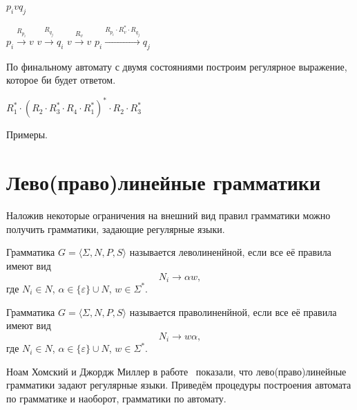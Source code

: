 $p_i v q_j$

$p_i \xrightarrow{R_{p_i}} v$
$v \xrightarrow{R_{q_j}} q_i$
$v \xrightarrow{R_v} v$
$p_i \xrightarrow{R_{p_i} \cdot R_v^* \cdot R_{q_j}} q_j$

По финальному автомату с двумя состояниями построим регулярное выражение, которое би будет ответом.


$R_1^* \cdot (R_2 \cdot R_3^* \cdot R_4 \cdot R_1^*)^* \cdot R_2 \cdot R_3^*$



Примеры.



\section{Лево(право)линейные грамматики}

Наложив некоторые ограничения на внешний вид правил грамматики можно получить грамматики, задающие регулярные языки.

\begin{definition}
    Грамматика $G=\langle \Sigma, N, P, S \rangle$ называется леволиненйной, если все её правила имеют вид
    \[N_i \to \alpha w,\]
    где $N_i \in N$, $\alpha \in \{\varepsilon\} \cup N$, $w \in \Sigma ^*$.
\end{definition}

\begin{definition}
    Грамматика $G=\langle \Sigma, N, P, S \rangle$ называется праволиненйной, если все её правила имеют вид
    \[N_i \to  w \alpha,\]
    где $N_i \in N$, $\alpha \in \{\varepsilon\} \cup N$, $w \in \Sigma ^*$.
\end{definition}

Ноам Хомский и Джордж Миллер в работе~ показали, что лево(право)линейные грамматики задают регулярные языки.
Приведём процедуры построения автомата по грамматике и наоборот, грамматики по автомату.

